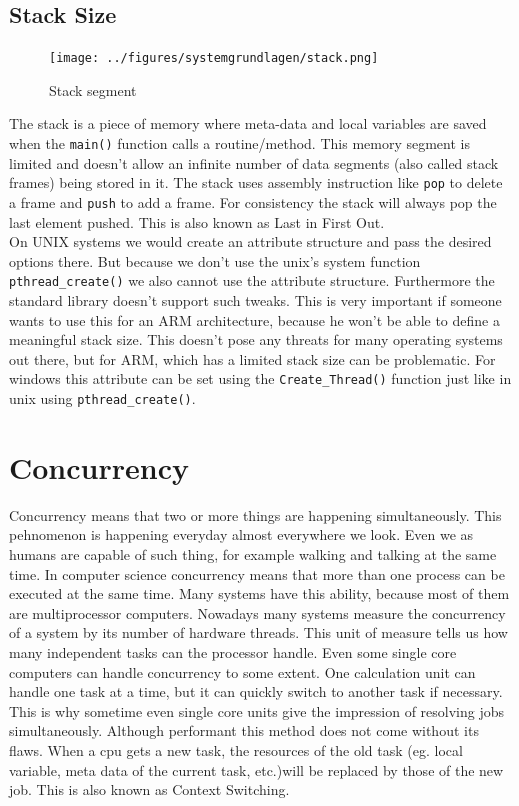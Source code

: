 \subsection{Stack Size}
\begin{figure}
	\centering
	\texttt{[image: ../figures/systemgrundlagen/stack.png]}
	\caption{Stack segment}
	\cite{stack}
\end{figure}
The stack is a piece of memory where meta-data and local variables are saved when the \texttt{main()} function calls a routine/method. This memory segment is limited and doesn't allow an infinite number of data segments (also called stack frames) being stored in it. The stack uses assembly instruction like \texttt{pop} to delete a frame and \texttt{push} to add a frame. For consistency the stack will always pop the last element pushed. This is also known as \dq Last in First Out\dq{}\cite{stack}.\\
On UNIX systems we would create an attribute structure and pass the
desired options there. But because we don't use the unix's system function \texttt{pthread\_create()} we also
cannot use the attribute structure. Furthermore the standard library doesn't support such tweaks. 
This is very important if someone wants to use this for an ARM architecture, because he won't be
able to define a meaningful stack size. This doesn't pose any threats for many operating systems out
there, but for ARM, which has a limited stack size can be problematic. For windows this attribute
can be set using the \texttt{Create\_Thread()} function just like in unix using \texttt{pthread\_create()}.
\newpage
\section{Concurrency}
\label{ssec:concurrency}
Concurrency means that two or more things are happening simultaneously. This pehnomenon is happening
everyday almost everywhere we look. Even we as humans are capable of such thing, for example walking
and talking at the same time. In computer science concurrency means that more than one process can
be executed at the same time. Many systems have this ability, because most of them are
multiprocessor computers. Nowadays many systems measure the concurrency of a system by its number of hardware threads. This
unit of measure tells us how many independent tasks can the processor handle. Even some single core computers can handle concurrency to some extent.
One calculation unit can handle one task at a time, but it can quickly switch to another task if
necessary. This is why sometime even single core units give the impression of resolving jobs
simultaneously\cite[Chapter~1]{concurrency}. Although performant this method does not come without its flaws. When a cpu gets a new task, the resources of the old task (eg. local variable, meta data of the current task, etc.)will be replaced by those of the new job. This is also known as \dq Context Switching\dq{}.\\
